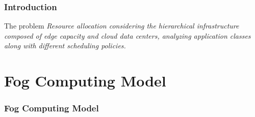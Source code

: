 \documentclass[10pt, pdf, xcolor=pdftex, dvipsnames, table]{beamer}
\begin{document}
\begin{frame}
	\frametitle{Introduction}
 	\begin{block}{The problem}
 			\textit{Resource allocation considering the hierarchical infrastructure composed of edge capacity and cloud data centers, analyzing application classes along with different scheduling policies.}
 	\end{block}
\end{frame}

\section[Fog Computing Model]{Fog Computing Model}

\begin{frame}
	\tableofcontents[currentsection]
\end{frame}

\begin{frame}
	\frametitle{Fog Computing Model}
\end{frame}
\end{document}
